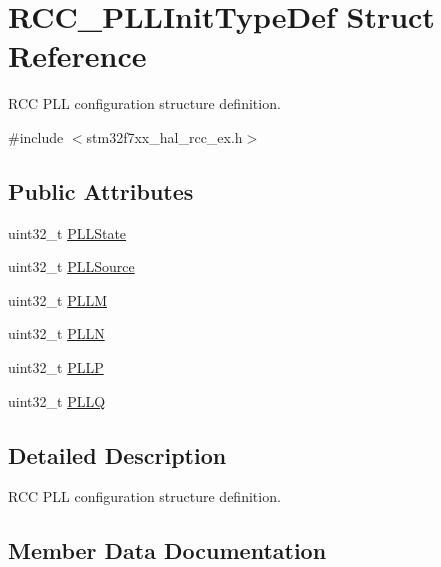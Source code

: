 \hypertarget{struct_r_c_c___p_l_l_init_type_def}{}\section{R\+C\+C\+\_\+\+P\+L\+L\+Init\+Type\+Def Struct Reference}
\label{struct_r_c_c___p_l_l_init_type_def}


R\+CC P\+LL configuration structure definition.  




{\ttfamily \#include $<$stm32f7xx\+\_\+hal\+\_\+rcc\+\_\+ex.\+h$>$}

\subsection*{Public Attributes}
\begin{DoxyCompactItemize}
\item 
uint32\+\_\+t \mbox{\hyperlink{struct_r_c_c___p_l_l_init_type_def_a6cbaf84f6566af15e6e4f97a339d5759}{P\+L\+L\+State}}
\item 
uint32\+\_\+t \mbox{\hyperlink{struct_r_c_c___p_l_l_init_type_def_a72806832a179af8756b9330de7f7c6a8}{P\+L\+L\+Source}}
\item 
uint32\+\_\+t \mbox{\hyperlink{struct_r_c_c___p_l_l_init_type_def_af8ae37696b35fd358c1ec1f6391158a4}{P\+L\+LM}}
\item 
uint32\+\_\+t \mbox{\hyperlink{struct_r_c_c___p_l_l_init_type_def_a2482608639ebfffc51a41135c979369b}{P\+L\+LN}}
\item 
uint32\+\_\+t \mbox{\hyperlink{struct_r_c_c___p_l_l_init_type_def_a4ecedf3ef401fa564aa636824fc3ded0}{P\+L\+LP}}
\item 
uint32\+\_\+t \mbox{\hyperlink{struct_r_c_c___p_l_l_init_type_def_a2b69dfec4b8ab52d649a71d141892691}{P\+L\+LQ}}
\end{DoxyCompactItemize}


\subsection{Detailed Description}
R\+CC P\+LL configuration structure definition. 

\subsection{Member Data Documentation}
\mbox{\label{struct_r_c_c___p_l_l_init_type_def_af8ae37696b35fd358c1ec1f6391158a4}} 
